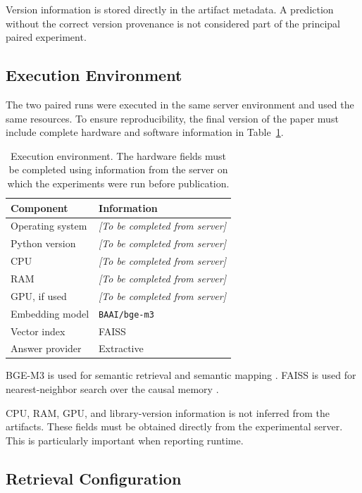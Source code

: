Version information is stored directly in the artifact metadata. A prediction
without the correct version provenance is not considered part of the principal
paired experiment.

\subsection{Execution Environment}

The two paired runs were executed in the same server environment and used the
same resources. To ensure reproducibility, the final version of the paper must
include complete hardware and software information in
Table~\ref{tab:environment}.

\begin{table}[t]
    \centering
    \caption{Execution environment. The hardware fields must be completed
    using information from the server on which the experiments were run before
    publication.}
    \label{tab:environment}
    \begin{tabular}{ll}
        \hline
        \textbf{Component} & \textbf{Information} \\
        \hline
        Operating system & \textit{[To be completed from server]} \\
        Python version & \textit{[To be completed from server]} \\
        CPU & \textit{[To be completed from server]} \\
        RAM & \textit{[To be completed from server]} \\
        GPU, if used & \textit{[To be completed from server]} \\
        Embedding model & \texttt{BAAI/bge-m3} \\
        Vector index & FAISS \\
        Answer provider & Extractive \\
        \hline
    \end{tabular}
\end{table}

BGE-M3 is used for semantic retrieval and semantic mapping
\cite{chen2024bgem3}. FAISS is used for nearest-neighbor search over the
causal memory \cite{johnson2019billion}.

CPU, RAM, GPU, and library-version information is not inferred from the
artifacts. These fields must be obtained directly from the experimental
server. This is particularly important when reporting runtime.

\subsection{Retrieval Configuration}

